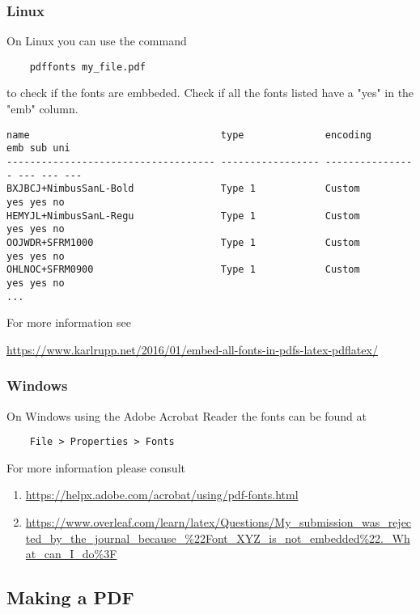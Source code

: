 \subsubsection{Linux}
On Linux you can use the command \begin{verbatim}
	pdffonts my_file.pdf
\end{verbatim}
to check if the fonts are embbeded. Check if all the fonts listed have a "yes" in the "emb" column. 
\begin{verbatim}
name                                 type              encoding         emb sub uni 
------------------------------------ ----------------- ---------------- --- --- --- 
BXJBCJ+NimbusSanL-Bold               Type 1            Custom           yes yes no     
HEMYJL+NimbusSanL-Regu               Type 1            Custom           yes yes no     
OOJWDR+SFRM1000                      Type 1            Custom           yes yes no      
OHLNOC+SFRM0900                      Type 1            Custom           yes yes no   
...
\end{verbatim}
For more information see 

\url{https://www.karlrupp.net/2016/01/embed-all-fonts-in-pdfs-latex-pdflatex/}
\subsubsection{Windows}
On Windows using the Adobe Acrobat Reader the fonts can be found at
\begin{verbatim}
	File > Properties > Fonts
\end{verbatim}
For more information please consult
\begin{enumerate}
	\item \url{https://helpx.adobe.com/acrobat/using/pdf-fonts.html}
	
	\item \url{https://www.overleaf.com/learn/latex/Questions/My_submission_was_rejected_by_the_journal_because_%22Font_XYZ_is_not_embedded%22._What_can_I_do%3F} 
	\end{enumerate}
	
	\subsection{Making a PDF}

